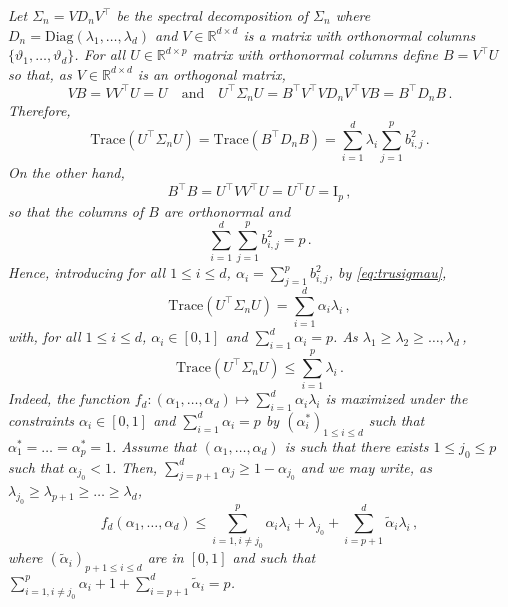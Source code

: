 \documentclass[a4paper,10pt,fleqn]{article}
\newcommand{\eqsp}{\,}
\newcommand{\rset}{\ensuremath{\mathbb{R}}}
\newcommand{\1}{\ensuremath{\mathbbm{1}}}
\newcommand{\bfU}{U}
\newcommand{\bfs}{\Sigma}
\newcommand{\bfV}{V}
\newcommand{\bfB}{B}
\newcommand{\bfI}{\mathrm{I}}
\newcommand{\bfD}{D}
\begin{document}
\begin{enumerate}
{\em
 Let $\bfs_n = \bfV\bfD_n\bfV^\top$ be the spectral decomposition of $\bfs_n$ where $\bfD_n = \mathrm{Diag}(\lambda_1,\ldots,\lambda_d)$ and $\bfV\in\rset^{d\times d}$  is a matrix with orthonormal columns $\{\vartheta_1,\ldots,\vartheta_d\}$. For all  $\bfU\in\rset^{d\times p}$ matrix with orthonormal columns define $\bfB = \bfV^\top\bfU$ so that, as $\bfV\in\rset^{d\times d}$ is an orthogonal matrix,
$$
\bfV\bfB = \bfV\bfV^\top\bfU = \bfU\quad\mathrm{and}\quad \bfU^\top\bfs_n \bfU = \bfB^\top\bfV^\top\bfV\bfD_n\bfV^\top\bfV\bfB = \bfB^\top\bfD_n\bfB\eqsp.
$$
Therefore,
\begin{equation}
\label{eq:trusigmau}
\mathrm{Trace}(\bfU^\top\bfs_n \bfU) = \mathrm{Trace}(\bfB^\top\bfD_n\bfB) = \sum_{i = 1}^d \lambda_i \sum_{j=1}^p b^2_{i,j}\eqsp.
\end{equation}
On the other hand,
$$
\bfB^\top\bfB = \bfU^\top\bfV\bfV^\top\bfU = \bfU^\top\bfU = \bfI_p\eqsp,
$$
so that the columns of $\bfB$ are orthonormal and
$$
\sum_{i = 1}^d \sum_{j=1}^p b^2_{i,j} = p\eqsp.
$$
Hence, introducing for all $1\leqslant i \leqslant d$, $\alpha_i =  \sum_{j=1}^p b^2_{i,j}$, by \eqref{eq:trusigmau},
$$
\mathrm{Trace}(\bfU^\top\bfs_n \bfU) = \sum_{i=1}^{d}\alpha_i\lambda_i\eqsp,
$$
with, for all $1\leqslant i\leqslant d$, $\alpha_i \in[0,1]$ and $\sum_{i=1}^d\alpha_i  = p$. As $\lambda_1 \geqslant \lambda_2\geqslant \ldots, \lambda_d$\eqsp,
$$
\mathrm{Trace}(\bfU^\top\bfs_n \bfU) \leqslant \sum_{i=1}^{p}\lambda_i\eqsp.
$$
Indeed, the function $f_d:(\alpha_1,\ldots,\alpha_d)\mapsto\sum_{i=1}^{d}\alpha_i\lambda_i$ is maximized under the constraints   $\alpha_i \in[0,1]$ and $\sum_{i=1}^d\alpha_i  = p$ by $(\alpha^*_i)_{1\leqslant i \leqslant d}$ such that $\alpha^*_1=\ldots=\alpha^*_p=1$. Assume that $(\alpha_1,\ldots,\alpha_d)$ is such that there exists $1\leqslant j_0\leqslant p$ such that $\alpha_{j_0}<1$. Then, $\sum_{j=p+1}^d\alpha_j \geqslant 1 - \alpha_{j_0}$ and we may write, as $\lambda_{j_0}\geqslant \lambda_{p+1}\geqslant \ldots\geqslant \lambda_d$,
$$
f_d(\alpha_1,\ldots,\alpha_d) \leqslant \sum_{i=1, i\neq j_0}^{p}\alpha_i\lambda_i + \lambda_{j_0} + \sum_{i=p+1}^{d}\tilde \alpha_i\lambda_i \eqsp,
$$
where $(\tilde \alpha_i)_{p+1\leqslant i\leqslant d}$ are in $[0,1]$ and such that $ \sum_{i=1, i\neq j_0}^{p}\alpha_i + 1 +  \sum_{i=p+1}^{d}\tilde\alpha_i = p$.


}
\end{enumerate}
\end{document}
